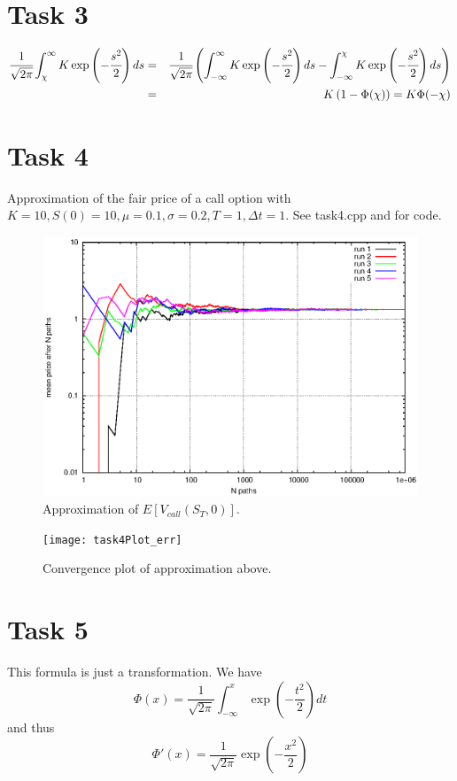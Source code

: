 \documentclass[]{article}
\begin{document}
\section*{Task 3}
\begin{eqnarray*}
\cfrac{1}{\sqrt{2\pi}}\int_{\chi}^{\infty}K\exp\left(-\cfrac{s^2}{2}\right)ds &
= & \cfrac{1}{\sqrt{2\pi}}\left(\int_{-\infty}^{\infty}K\exp\left(-\cfrac{s^2}{2}\right)ds
- \int_{-\infty}^{\chi}K\exp\left(-\cfrac{s^2}{2}\right)ds \right) \\
& = & K\left(1 - \Phi(\chi)\right) = K \Phi(-\chi)
\end{eqnarray*}

\section*{Task 4}
Approximation of the fair price of a call option with $K=10,S(0)=10,\mu=0.1,\sigma=0.2,T=1,\Delta t=1$. See task4.cpp and for code. 
\begin{figure}[!ht]
\centering
\includegraphics{task4Plot}
\caption{Approximation of $E\left[V_{call}(S_T,0)\right]$.}
\label{fig:Task4a}
\end{figure}
\begin{figure}[!ht]
\centering
\texttt{[image: task4Plot\_err]}
\caption{Convergence plot of approximation above.}
\label{fig:Task4b}
\end{figure}
\clearpage

\section*{Task 5} This formula is just a transformation. We have
\[\Phi(x)=\dfrac{1}{\sqrt{2\pi}}\int_{-\infty}^x
\exp\left({-\dfrac{t^2}{2}}\right)dt\] 
and thus
\[\Phi'(x)=\dfrac{1}{\sqrt{2\pi}}\exp\left({-\dfrac{x^2}{2}}\right)\]
\end{document}
